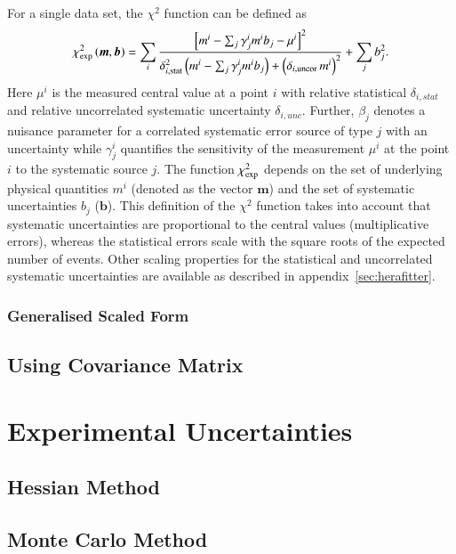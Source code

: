 \documentclass[11pt,a4paper]{article}
\begin{document}
For a single data set, 
 the $\chi^2$ function can be defined as~\cite{H1:2009bp}
%
\begin{equation}
 \chi^2_{\rm exp}\left(\boldsymbol{m},\boldsymbol{b}\right) = %
 \sum_i
 \frac{\left[m^i
- \sum_j \gamma^i_j m^i b_j  - {\mu^i} \right]^2}
{ \textstyle \delta^2_{i,{\rm stat}}\left(m^i -  \sum_j \gamma^i_j m^i b_j\right)+
\left(\delta_{i,{\rm uncor}}\,  m^i\right)^2}
 + \sum_j b^2_j.
\label{eq:ave}\end{equation}
%
Here ${\mu^i}$ is the  measured central value  at a point $i$ 
with  relative statistical $\delta_{i,stat}$ 
and relative uncorrelated systematic uncertainty $\delta_{i,unc}$.
Further, $\beta_j$ denotes a nuisance parameter for
 a correlated systematic error  source of type $j$ with an uncertainty
 while
$\gamma^i_j$ 
quantifies the sensitivity of the
measurement ${\mu^i}$ at the point $i$ to the systematic source $j$. 
The function $\chi^2_{\rm exp}$ depends on the set of
underlying physical quantities $m^i$ 
(denoted as the vector $\boldsymbol{m}$) and 
 the set of systematic uncertainties $b_j$ ($\boldsymbol{b}$).
This definition of the $\chi^2$ function takes into account that
systematic uncertainties are proportional to the central values 
(multiplicative errors), whereas the statistical errors scale 
with the square roots of the expected number of events. 
Other scaling properties for the statistical and uncorrelated
systematic uncertainties are available as described in appendix~\ref{sec:herafitter}.
\subsubsection{Generalised Scaled Form}

\subsection{Using Covariance Matrix}
\section{Experimental Uncertainties}
\subsection{Hessian Method}

\subsection{Monte Carlo Method}
\end{document}
